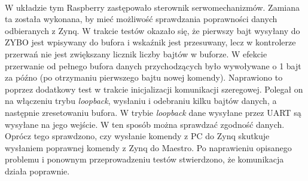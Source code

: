 \paragraph*{}
W układzie tym Raspberry zastępowało sterownik serwomechanizmów.
Zamiana ta została wykonana, by mieć możliwość sprawdzania poprawności danych odbieranych z Zynq.
W trakcie testów okazało się, że pierwszy bajt wysyłany do ZYBO jest wpisywany do bufora i wskaźnik jest przesuwany, lecz w kontrolerze przerwań nie jest zwiększany licznik liczby bajtów w buforze.
W efekcie przerwanie od pełnego bufora danych przychodzących było wywoływane o 1 bajt za późno (po otrzymaniu pierwszego bajtu nowej komendy).
Naprawiono to poprzez dodatkowy test w trakcie inicjalizacji komunikacji szeregowej.
Polegał on na włączeniu trybu \textit{loopback}, wysłaniu i odebraniu kilku bajtów danych, a następnie zresetowaniu bufora. W trybie \textit{loopback} dane wysyłane przez UART są wysyłane na jego wejście.
W ten sposób można sprawdzać zgodność danych.
Oprócz tego sprawdzono, czy wysłanie komendy z PC do Zynq skutkuje wysłaniem poprawnej komendy z Zynq do Maestro.
Po naprawieniu opisanego problemu i ponownym przeprowadzeniu testów stwierdzono, że komunikacja działa poprawnie.